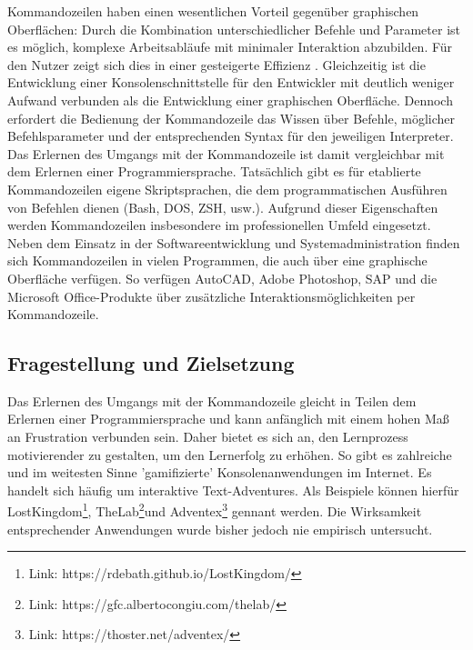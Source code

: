 Kommandozeilen haben einen wesentlichen Vorteil gegenüber graphischen Oberflächen: Durch die Kombination unterschiedlicher Befehle und Parameter ist es möglich, komplexe Arbeitsabläufe mit minimaler Interaktion abzubilden. Für den Nutzer zeigt sich dies in einer gesteigerte Effizienz \cite{Kumar2005}. Gleichzeitig ist die Entwicklung einer Konsolenschnittstelle für den Entwickler mit deutlich weniger Aufwand verbunden als die Entwicklung einer graphischen Oberfläche. Dennoch erfordert die Bedienung der Kommandozeile das Wissen über Befehle, möglicher Befehlsparameter und der entsprechenden Syntax für den jeweiligen Interpreter. Das Erlernen des Umgangs mit der Kommandozeile ist damit vergleichbar mit dem Erlernen einer Programmiersprache. Tatsächlich gibt es für etablierte Kommandozeilen eigene Skriptsprachen, die dem programmatischen Ausführen von Befehlen dienen (Bash, DOS, ZSH, usw.). Aufgrund dieser Eigenschaften werden Kommandozeilen insbesondere im professionellen Umfeld eingesetzt. Neben dem Einsatz in der Softwareentwicklung und Systemadministration finden sich Kommandozeilen in vielen Programmen, die auch über eine graphische Oberfläche verfügen. So verfügen AutoCAD, Adobe Photoshop, SAP und die Microsoft Office-Produkte über zusätzliche Interaktionsmöglichkeiten per Kommandozeile.




\subsection{Fragestellung und Zielsetzung}
Das Erlernen des Umgangs mit der Kommandozeile gleicht in Teilen dem Erlernen einer Programmiersprache und kann anfänglich mit einem hohen Maß an Frustration verbunden sein. Daher bietet es sich an, den Lernprozess motivierender zu gestalten, um den Lernerfolg zu erhöhen. So gibt es zahlreiche und im weitesten Sinne 'gamifizierte' Konsolenanwendungen im Internet. Es handelt sich häufig um interaktive Text-Adventures. Als Beispiele können hierfür LostKingdom\footnote{Link: https://rdebath.github.io/LostKingdom/}, TheLab\footnote{Link: https://gfc.albertocongiu.com/thelab/}und Adventex\footnote{Link: https://thoster.net/adventex/} gennant werden. Die Wirksamkeit entsprechender Anwendungen wurde bisher jedoch nie empirisch untersucht. 

